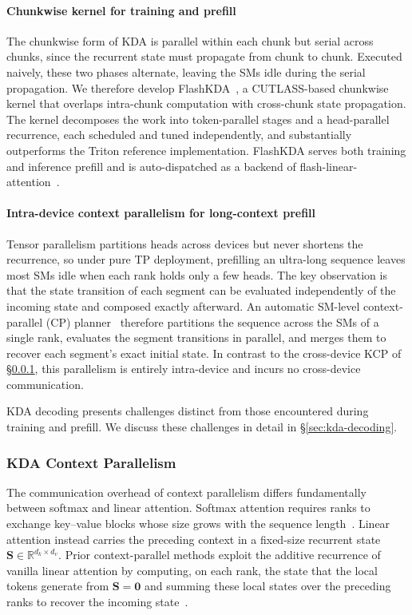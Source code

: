\paragraph{Chunkwise kernel for training and prefill}
The chunkwise form of KDA is parallel within each chunk but serial across chunks, since the recurrent state must propagate from chunk to chunk.
Executed naively, these two phases alternate, leaving the SMs idle during the serial propagation.
We therefore develop FlashKDA~\citep{flashkda2026}, a CUTLASS-based chunkwise kernel that overlaps intra-chunk computation with cross-chunk state propagation.
The kernel decomposes the work into token-parallel stages and a head-parallel recurrence, each scheduled and tuned independently, and substantially outperforms the Triton reference implementation.
FlashKDA serves both training and inference prefill and is auto-dispatched as a backend of flash-linear-attention~\citep{yang2024fla}.

\paragraph{Intra-device context parallelism for long-context prefill}
Tensor parallelism partitions heads across devices but never shortens the recurrence, so under pure TP deployment, prefilling an ultra-long sequence leaves most SMs idle when each rank holds only a few heads.
The key observation is that the state transition of each segment can be evaluated independently of the incoming state and composed exactly afterward.
An automatic SM-level context-parallel (CP) planner~\cite{yywang2025deltanetcp,yang2024fla} therefore partitions the sequence across the SMs of a single rank, evaluates the segment transitions in parallel, and merges them to recover each segment's exact initial state.
In contrast to the cross-device KCP of \S\ref{sec:kda-cp}, this parallelism is entirely intra-device and incurs no cross-device communication.

KDA decoding presents challenges distinct from those encountered during training and prefill. We discuss these challenges in detail in \S\ref{sec:kda-decoding}.


\subsubsection{KDA Context Parallelism}
\label{sec:kda-cp}

The communication overhead of context parallelism differs fundamentally between softmax and linear attention.
Softmax attention requires ranks to exchange key--value blocks whose size grows with the sequence length~\citep{liu2023ring}.
Linear attention instead carries the preceding context in a fixed-size recurrent state $\mathbf{S}\in\mathbb{R}^{d_k\times d_v}$.
Prior context-parallel methods exploit the additive recurrence of vanilla linear attention by computing, on each rank, the state that the local tokens generate from $\mathbf{S}=\mathbf{0}$ and summing these local states over the preceding ranks to recover the incoming state~\citep{sun2024lasp,sun2025lasp2}.


